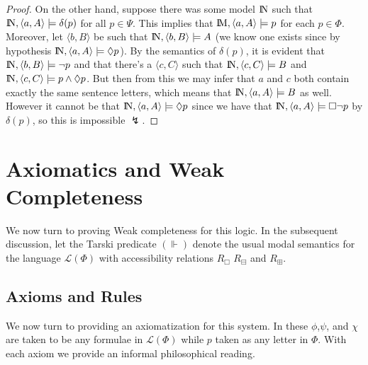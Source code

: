 \documentclass[11pt]{article}
\newcommand{\ra}{\rangle}
\newcommand{\la}{\langle}
\newcommand{\Nec}{\Box}
\newcommand{\Pos}{\Diamond}
\newcommand{\BB}{\boxminus}
\newcommand{\BBI}{\boxplus}
\begin{document}
\begin{proof}
On the other hand, suppose there was some model $\bbN$ such that $\bbN, \la a, A\ra \models \delta(p)$ for all $p \in \Psi$.  This implies that $\bbM, \la a, A\ra \models p$ for each $p \in \Phi$.  Moreover, let $\la b, B\ra$ be such that $\bbN,\la b, B\ra\models A$ (we know one exists since by hypothesis $\bbN, \la a, A\ra \models \Pos p$).  By the semantics of $\delta(p)$, it is evident that $\bbN, \la b, B\ra \models \neg p$ and that there's a $\la c, C\ra$ such that $\bbN,\la c,C \ra \models B$ and $\bbN,\la c,C \ra \models p \wedge \Pos p$.  But then from this we may infer that $a$ and $c$ both contain exactly the same sentence letters, which means that $\bbN,\la a,A\ra \models B$ as well.  However it cannot be that $\bbN,\la a,A \ra \models \Pos p$ since we have that $\bbN,\la a,A \ra \models \Nec \neg p$ by $\delta(p)$, so this is impossible $\lightning$.
\end{proof}

\section{Axiomatics and Weak Completeness}

We now turn to proving Weak completeness for this logic.  In the subsequent discussion, let the Tarski predicate $(\Vdash)$ denote the usual modal semantics for the language $\mathcal{L}(\Phi)$ with accessibility relations $R_\Box$ $R_\BB$ and $R_\BBI$.

\subsection{Axioms and Rules}

We now turn to providing an axiomatization for this system.  In these $\phi$,$\psi$, and $\chi$ are taken to be any formulae in $\mathcal{L}(\Phi)$ while  $p$ taken as any letter in $\Phi$.  With each axiom we provide an informal philosophical reading.

\setcounter{rownum}{0}
\end{document}
